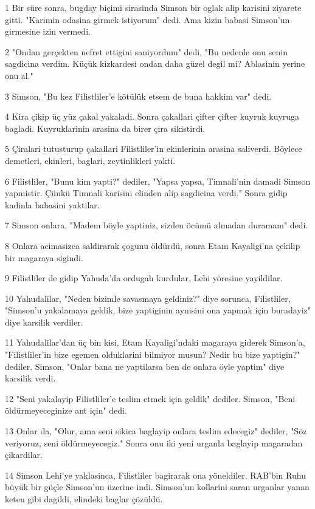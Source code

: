 \par 1 Bir süre sonra, bugday biçimi sirasinda Simson bir oglak alip karisini ziyarete gitti. "Karimin odasina girmek istiyorum" dedi. Ama kizin babasi Simson'un girmesine izin vermedi.
\par 2 "Ondan gerçekten nefret ettigini saniyordum" dedi, "Bu nedenle onu senin sagdicina verdim. Küçük kizkardesi ondan daha güzel degil mi? Ablasinin yerine onu al."
\par 3 Simson, "Bu kez Filistliler'e kötülük etsem de buna hakkim var" dedi.
\par 4 Kira çikip üç yüz çakal yakaladi. Sonra çakallari çifter çifter kuyruk kuyruga bagladi. Kuyruklarinin arasina da birer çira sikistirdi.
\par 5 Çiralari tutusturup çakallari Filistliler'in ekinlerinin arasina saliverdi. Böylece demetleri, ekinleri, baglari, zeytinlikleri yakti.
\par 6 Filistliler, "Bunu kim yapti?" dediler, "Yapsa yapsa, Timnali'nin damadi Simson yapmistir. Çünkü Timnali karisini elinden alip sagdicina verdi." Sonra gidip kadinla babasini yaktilar.
\par 7 Simson onlara, "Madem böyle yaptiniz, sizden öcümü almadan duramam" dedi.
\par 8 Onlara acimasizca saldirarak çogunu öldürdü, sonra Etam Kayaligi'na çekilip bir magaraya sigindi.
\par 9 Filistliler de gidip Yahuda'da ordugah kurdular, Lehi yöresine yayildilar.
\par 10 Yahudalilar, "Neden bizimle savasmaya geldiniz?" diye sorunca, Filistliler, "Simson'u yakalamaya geldik, bize yaptiginin aynisini ona yapmak için buradayiz" diye karsilik verdiler.
\par 11 Yahudalilar'dan üç bin kisi, Etam Kayaligi'ndaki magaraya giderek Simson'a, "Filistliler'in bize egemen olduklarini bilmiyor musun? Nedir bu bize yaptigin?" dediler. Simson, "Onlar bana ne yaptilarsa ben de onlara öyle yaptim" diye karsilik verdi.
\par 12 "Seni yakalayip Filistliler'e teslim etmek için geldik" dediler. Simson, "Beni öldürmeyeceginize ant için" dedi.
\par 13 Onlar da, "Olur, ama seni sikica baglayip onlara teslim edecegiz" dediler, "Söz veriyoruz, seni öldürmeyecegiz." Sonra onu iki yeni urganla baglayip magaradan çikardilar.
\par 14 Simson Lehi'ye yaklasinca, Filistliler bagirarak ona yöneldiler. RAB'bin Ruhu büyük bir güçle Simson'un üzerine indi. Simson'un kollarini saran urganlar yanan keten gibi dagildi, elindeki baglar çözüldü.

